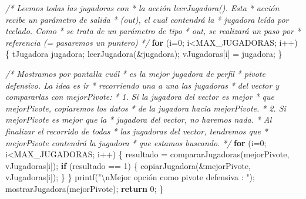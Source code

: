 \documentclass[
]{book}
\newenvironment{Shaded}{\begin{snugshade}}{\end{snugshade}}
\newcommand{\CommentTok}[1]{\textcolor[rgb]{0.56,0.35,0.01}{\textit{#1}}}
\newcommand{\ControlFlowTok}[1]{\textcolor[rgb]{0.13,0.29,0.53}{\textbf{#1}}}
\newcommand{\DecValTok}[1]{\textcolor[rgb]{0.00,0.00,0.81}{#1}}
\newcommand{\NormalTok}[1]{#1}
\newcommand{\SpecialCharTok}[1]{\textcolor[rgb]{0.00,0.00,0.00}{#1}}
\newcommand{\StringTok}[1]{\textcolor[rgb]{0.31,0.60,0.02}{#1}}
\begin{document}
\begin{Shaded}
\begin{Highlighting}[]
    \CommentTok{/* Leemos todas las jugadoras con}
\CommentTok{     * la acción leerJugadora(). Esta}
\CommentTok{     * acción recibe un parámetro de salida}
\CommentTok{     * (out), el cual contendrá la}
\CommentTok{     * jugadora leída por teclado. Como}
\CommentTok{     * se trata de un parámetro de tipo}
\CommentTok{     * out, se realizará un paso por}
\CommentTok{     * referencia (= pasaremos un puntero)}
\CommentTok{     */}
    \ControlFlowTok{for}\NormalTok{ (i=}\DecValTok{0}\NormalTok{; i\textless{}MAX\_JUGADORAS; i++) \{}
\NormalTok{        tJugadora jugadora;}
\NormalTok{        leerJugadora(\&jugadora);}
\NormalTok{        vJugadoras[i] = jugadora;}
\NormalTok{    \}}

    \CommentTok{/* Mostramos por pantalla cuál}
\CommentTok{     * es la mejor jugadora de perfil}
\CommentTok{     * pivote defensivo. La idea es ir}
\CommentTok{     * recorriendo una a una las jugadoras}
\CommentTok{     * del vector y compararlas con mejorPivote:}
\CommentTok{     * 1. Si la jugadora del vector es mejor}
\CommentTok{     *    que mejorPivote, copiaremos los datos}
\CommentTok{     *    de la jugadora hacia mejorPivote.}
\CommentTok{     * 2. Si mejorPivote es mejor que la}
\CommentTok{     *    jugadora del vector, no haremos nada.}
\CommentTok{     * Al finalizar el recorrido de todas}
\CommentTok{     * las jugadoras del vector, tendremos que}
\CommentTok{     * mejorPivote contendrá la jugadora}
\CommentTok{     * que estamos buscando.}
\CommentTok{     */}
    \ControlFlowTok{for}\NormalTok{ (i=}\DecValTok{0}\NormalTok{; i\textless{}MAX\_JUGADORAS; i++) \{}
\NormalTok{        resultado = compararJugadoras(mejorPivote, vJugadoras[i]);}
        \ControlFlowTok{if}\NormalTok{ (resultado == }\DecValTok{1}\NormalTok{) \{}
\NormalTok{            copiarJugadora(\&mejorPivote, vJugadoras[i]);}
\NormalTok{        \}}
\NormalTok{    \}}
\NormalTok{    printf(}\StringTok{"}\SpecialCharTok{\textbackslash{}n}\StringTok{Mejor opción como pivote defensiva : "}\NormalTok{);}
\NormalTok{    mostrarJugadora(mejorPivote);}
    \ControlFlowTok{return} \DecValTok{0}\NormalTok{;}
\NormalTok{\}}


\end{Highlighting}
\end{Shaded}
\end{document}
